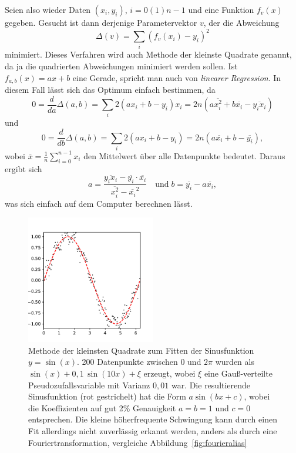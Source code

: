 Seien also wieder Daten $(x_i, y_i)$, $i=0(1)n-1$ und eine Funktion
$f_v(x)$ gegeben. Gesucht ist dann derjenige Parametervektor $v$, der
die Abweichung
\begin{equation}
  \label{eq:leastsq}
  \Delta(v) = \sum_i (f_v(x_i) - y_i)^2
\end{equation}
minimiert. Dieses Verfahren wird auch Methode der kleinste Quadrate
genannt, da ja die quadrierten Abweichungen minimiert werden
sollen. Ist $f_{a,b}(x) = ax + b$ eine Gerade, spricht man auch von
\emph{linearer Regression}. In diesem Fall lässt
sich das Optimum einfach bestimmen, da
\begin{equation}
  0 = \frac{d}{da} \Delta(a,b) = \sum_i 2 (a x_i + b - y_i)x_i
  = 2n \left(a  \overline{x_i^2} + b \overline{x_i} -
    \overline{y_ix_i} \right)
\end{equation}
und
\begin{equation}
  0 = \frac{d}{db} \Delta(a,b) = \sum_i 2 (a x_i + b - y_i)
  = 2n \left(a  \overline{x_i} + b - \overline{y_i} \right),
\end{equation}
wobei $\overline{x} = \frac{1}{n} \sum_{i=0}^{n-1} x_i$ den Mittelwert
über alle Datenpunkte bedeutet. Daraus ergibt sich
\begin{equation}
  a = \frac{\overline{y_ix_i} -
    \overline{y_i}\cdot\overline{x_i}}{\overline{x_i^2}-\overline{x_i}^2}
  \quad\text{und}\;
  b = \overline{y_i} - a \overline{x_i},
\end{equation}
was sich einfach auf dem Computer berechnen lässt.

\begin{figure}
  \centering
  \includegraphics[width=0.5\textwidth]{plots/leastsq}
  \caption{Methode der kleinsten Quadrate zum Fitten der Sinusfunktion
    $y=\sin(x)$. 200 Datenpunkte zwischen 0 und $2\pi$ wurden als
    $\sin(x) + 0,1\,\sin(10 x) + \xi$ erzeugt, wobei $\xi$ eine
    Gauß-verteilte Pseudozufallsvariable mit Varianz $0,01$ war. Die
    resultierende Sinusfunktion (rot gestrichelt) hat die Form $a
    \sin(bx+c)$, wobei die Koeffizienten auf gut 2\% Genauigkeit
    $a=b=1$ und $c=0$ entsprechen. Die kleine höherfrequente
    Schwingung kann durch einen Fit allerdings nicht zuverlässig
    erkannt werden, anders als durch eine Fouriertransformation,
    vergleiche Abbildung~\ref{fig:fourieralias}}
  \label{fig:leastsq}
\end{figure}

